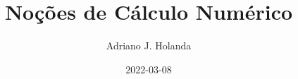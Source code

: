 \documentclass{beamer}
\begin{document}
\title{Noções de Cálculo Numérico}
\author{Adriano J. Holanda}
\date{2022-03-08}



%
%
\end{document}
